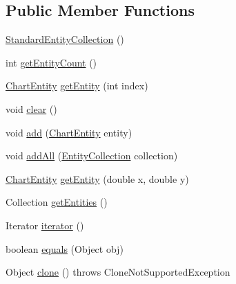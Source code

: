 \subsection*{Public Member Functions}
\begin{DoxyCompactItemize}
\item 
\mbox{\hyperlink{classorg_1_1jfree_1_1chart_1_1entity_1_1_standard_entity_collection_a024f0615a467fd456b16d8ad00b652a3}{Standard\+Entity\+Collection}} ()
\item 
int \mbox{\hyperlink{classorg_1_1jfree_1_1chart_1_1entity_1_1_standard_entity_collection_addd9f5935fb56802f93fd4ee2964b573}{get\+Entity\+Count}} ()
\item 
\mbox{\hyperlink{classorg_1_1jfree_1_1chart_1_1entity_1_1_chart_entity}{Chart\+Entity}} \mbox{\hyperlink{classorg_1_1jfree_1_1chart_1_1entity_1_1_standard_entity_collection_ab0e34b7a08332d1bca47c42026f04bbb}{get\+Entity}} (int index)
\item 
void \mbox{\hyperlink{classorg_1_1jfree_1_1chart_1_1entity_1_1_standard_entity_collection_adf0e1158e1b1505658fd5620b111f477}{clear}} ()
\item 
void \mbox{\hyperlink{classorg_1_1jfree_1_1chart_1_1entity_1_1_standard_entity_collection_a9a5df7e5ad5a7b41808b75b63f9aa0f6}{add}} (\mbox{\hyperlink{classorg_1_1jfree_1_1chart_1_1entity_1_1_chart_entity}{Chart\+Entity}} entity)
\item 
void \mbox{\hyperlink{classorg_1_1jfree_1_1chart_1_1entity_1_1_standard_entity_collection_a82dc76894c237d1d31870aacb148f023}{add\+All}} (\mbox{\hyperlink{interfaceorg_1_1jfree_1_1chart_1_1entity_1_1_entity_collection}{Entity\+Collection}} collection)
\item 
\mbox{\hyperlink{classorg_1_1jfree_1_1chart_1_1entity_1_1_chart_entity}{Chart\+Entity}} \mbox{\hyperlink{classorg_1_1jfree_1_1chart_1_1entity_1_1_standard_entity_collection_aa9af27932bd992d956e77272c8a15d06}{get\+Entity}} (double x, double y)
\item 
Collection \mbox{\hyperlink{classorg_1_1jfree_1_1chart_1_1entity_1_1_standard_entity_collection_a1f90d01a5346a42c64d91d129017b4da}{get\+Entities}} ()
\item 
Iterator \mbox{\hyperlink{classorg_1_1jfree_1_1chart_1_1entity_1_1_standard_entity_collection_add3c9d1d34e8cfa4225356a2a01e9248}{iterator}} ()
\item 
boolean \mbox{\hyperlink{classorg_1_1jfree_1_1chart_1_1entity_1_1_standard_entity_collection_ae4d4ca3876173f5f729a3caaadaf28c7}{equals}} (Object obj)
\item 
Object \mbox{\hyperlink{classorg_1_1jfree_1_1chart_1_1entity_1_1_standard_entity_collection_a1f7eb283f861a417278c03951633c2ff}{clone}} ()  throws Clone\+Not\+Supported\+Exception 
\end{DoxyCompactItemize}


